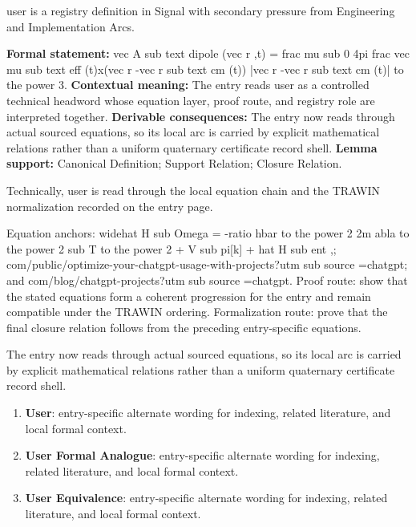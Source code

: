 
\begingroup\small
{}
user is a registry definition in Signal with secondary pressure from Engineering and Implementation Arcs.

\begingroup\footnotesize\setlength{\emergencystretch}{3em}\sloppy
\textbf{Formal statement:} vec A sub text dipole (vec r ,t) = frac mu sub 0 4pi frac vec mu sub text eff (t)x(vec r -vec r sub text cm (t)) |vec r -vec r sub text cm (t)| to the power 3. \textbf{Contextual meaning:} The entry reads user as a controlled technical headword whose equation layer, proof route, and registry role are interpreted together. \textbf{Derivable consequences:} The entry now reads through actual sourced equations, so its local arc is carried by explicit mathematical relations rather than a uniform quaternary certificate record shell. \textbf{Lemma support:} Canonical Definition; Support Relation; Closure Relation.\par
\endgroup

Technically, user is read through the local equation chain and the TRAWIN normalization recorded on the entry page.

Equation anchors: widehat H sub Omega = -ratio hbar to the power 2 2m abla to the power 2 sub T to the power 2 + V sub pi[k] + hat H sub ent ,; com/public/optimize-your-chatgpt-usage-with-projects?utm sub source =chatgpt; and com/blog/chatgpt-projects?utm sub source =chatgpt. Proof route: show that the stated equations form a coherent progression for the entry and remain compatible under the TRAWIN ordering. Formalization route: prove that the final closure relation follows from the preceding entry-specific equations.

The entry now reads through actual sourced equations, so its local arc is carried by explicit mathematical relations rather than a uniform quaternary certificate record shell.
\endgroup

\begin{enumerate}[leftmargin=1.6em,itemsep=6pt,topsep=4pt]
\item \textbf{User}: entry-specific alternate wording for indexing, related literature, and local formal context.
\item \textbf{User Formal Analogue}: entry-specific alternate wording for indexing, related literature, and local formal context.
\item \textbf{User Equivalence}: entry-specific alternate wording for indexing, related literature, and local formal context.
\end{enumerate}

